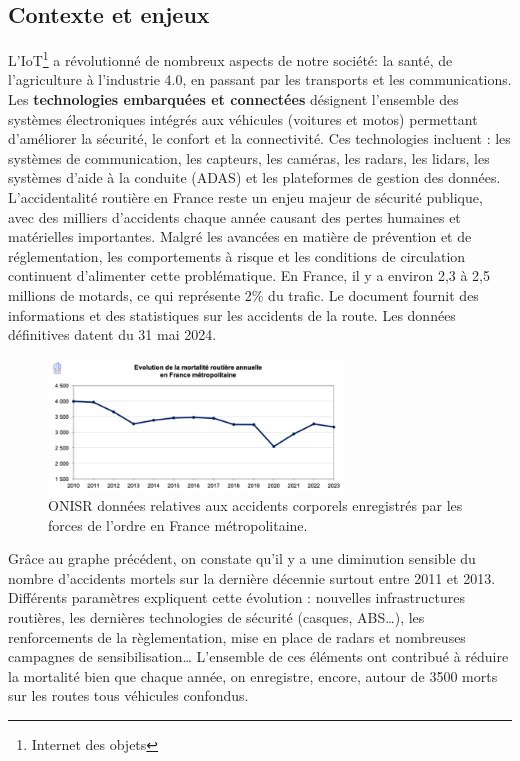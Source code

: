 \documentclass{article}
\begin{document}
\subsection{Contexte et enjeux}
L'IoT\footnote{Internet des objets} a révolutionné de nombreux aspects de notre société: la santé, de l'agriculture à l'industrie 4.0, en passant par les transports et les communications.
Les \textbf{technologies embarquées et connectées} désignent l’ensemble des systèmes électroniques intégrés aux véhicules (voitures et motos) permettant d’améliorer la sécurité, le confort et la connectivité. Ces technologies incluent : les systèmes de communication, les capteurs, les caméras, les radars, les lidars, les systèmes d’aide à la conduite (ADAS) et les plateformes de gestion des données.\\
L’accidentalité routière en France reste un enjeu majeur de sécurité publique, avec des milliers d’accidents chaque année causant des pertes humaines et matérielles importantes. Malgré les avancées en matière de prévention et de réglementation, les comportements à risque et les conditions de circulation continuent d’alimenter cette problématique.
En France, il y a environ 2,3 à 2,5 millions de motards\cite{actiEouteNbMotardFr}, ce qui représente 2\%  du trafic.
Le document\cite{la_securite_routiere_accidentalite_2024} fournit des informations et des statistiques sur les accidents de la route. Les données définitives datent du 31 mai 2024.

\begin{figure}[h]
    \centering
    \includegraphics[width=0.7\textwidth]{images/evolution_mortalite_securite_routiere_france.png} 
    \caption{ONISR données relatives aux accidents corporels enregistrés par les forces de l'ordre en France métropolitaine.}
\end{figure}

Grâce au graphe précédent, on constate qu’il y a une diminution sensible du nombre d’accidents mortels sur la dernière décennie surtout entre 2011 et 2013. Différents paramètres expliquent cette évolution : nouvelles infrastructures routières, les dernières technologies de sécurité (casques, ABS…), les renforcements de la règlementation, mise en place de radars et nombreuses campagnes de sensibilisation… L’ensemble de ces éléments ont contribué à réduire la mortalité bien que chaque année, on enregistre, encore, autour de 3500 morts sur les routes tous véhicules confondus. 
\end{document}
